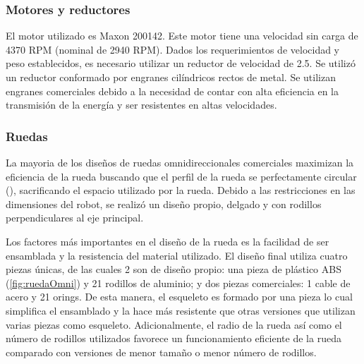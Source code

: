 \documentclass[twocolumn,10pt]{amrob}
\begin{document}
\subsubsection*{Motores y reductores}
El motor utilizado es Maxon 200142. Este motor tiene una velocidad sin carga de 4370 RPM (nominal de 2940 RPM). Dados los requerimientos de velocidad y peso establecidos, es necesario utilizar un reductor de velocidad de 2.5. Se utilizó un reductor conformado por engranes cilíndricos rectos de metal. Se utilizan engranes comerciales debido a la necesidad de contar con alta eficiencia en la transmisión de la energía y ser resistentes en altas velocidades.


\subsubsection*{Ruedas}
La mayoria de los diseños de ruedas omnidireccionales comerciales maximizan la eficiencia de la rueda buscando que el perfil de la rueda se perfectamente circular (\cite{rojas2005short}), sacrificando el espacio utilizado por la rueda. Debido a las restricciones en las dimensiones del robot, se realizó un diseño propio, delgado y con rodillos perpendiculares al eje principal.

Los factores más importantes en el diseño de la rueda es la facilidad de ser ensamblada y la resistencia del material utilizado. El diseño final utiliza cuatro piezas únicas, de las cuales 2 son de diseño propio: una pieza de plástico ABS (\ref{fig:ruedaOmni}) y 21 rodillos de aluminio; y dos piezas comerciales: 1 cable de acero y 21 orings. De esta manera, el esqueleto es formado por una pieza lo cual simplifica el ensamblado y la hace más resistente que otras versiones que utilizan varias piezas como esqueleto. Adicionalmente, el radio de la rueda así como el número de rodillos utilizados favorece un funcionamiento eficiente de la rueda comparado con versiones de menor tamaño o menor número de rodillos.
\end{document}
